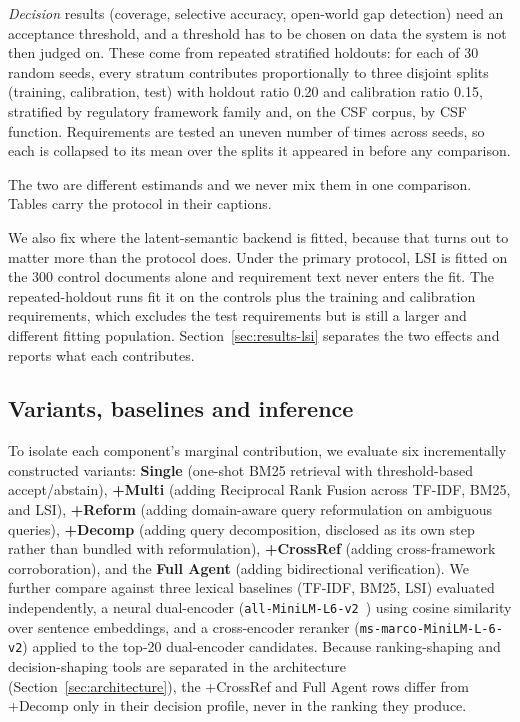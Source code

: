\documentclass[smallextended,natbib]{svjour3}
\begin{document}
\emph{Decision} results (coverage, selective accuracy, open-world gap detection) need an acceptance threshold, and a threshold has to be chosen on data the system is not then judged on. These come from repeated stratified holdouts: for each of 30 random seeds, every stratum contributes proportionally to three disjoint splits (training, calibration, test) with holdout ratio 0.20 and calibration ratio 0.15, stratified by regulatory framework family and, on the CSF corpus, by CSF function. Requirements are tested an uneven number of times across seeds, so each is collapsed to its mean over the splits it appeared in before any comparison.

The two are different estimands and we never mix them in one comparison. Tables carry the protocol in their captions.

We also fix where the latent-semantic backend is fitted, because that turns out to matter more than the protocol does. Under the primary protocol, LSI is fitted on the 300 control documents alone and requirement text never enters the fit. The repeated-holdout runs fit it on the controls plus the training and calibration requirements, which excludes the test requirements but is still a larger and different fitting population. Section~\ref{sec:results-lsi} separates the two effects and reports what each contributes.

\subsection{Variants, baselines and inference}

To isolate each component's marginal contribution, we evaluate six incrementally constructed variants: \textbf{Single} (one-shot BM25 retrieval with threshold-based accept/abstain), \textbf{+Multi} (adding Reciprocal Rank Fusion across TF-IDF, BM25, and LSI), \textbf{+Reform} (adding domain-aware query reformulation on ambiguous queries), \textbf{+Decomp} (adding query decomposition, disclosed as its own step rather than bundled with reformulation), \textbf{+CrossRef} (adding cross-framework corroboration), and the \textbf{Full Agent} (adding bidirectional verification).
We further compare against three lexical baselines (TF-IDF, BM25, LSI) evaluated independently, a neural dual-encoder (\texttt{all-MiniLM-L6-v2}~\citep{Reimers2019}) using cosine similarity over sentence embeddings, and a cross-encoder reranker (\texttt{ms-marco-MiniLM-L-6-v2}) applied to the top-20 dual-encoder candidates.
Because ranking-shaping and decision-shaping tools are separated in the architecture (Section~\ref{sec:architecture}), the +CrossRef and Full Agent rows differ from +Decomp only in their decision profile, never in the ranking they produce.
\end{document}
